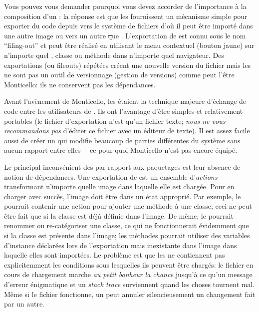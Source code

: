 \documentclass[a4paper,10pt,twoside]{book}
\begin{document}
Vous pouvez vous demander pourquoi vous devez accorder de l'importance \`a la composition
d'un \changeset: la r\'eponse est que les \changesets fournissent un m\'ecanisme simple
pour exporter du code depuis \pharo vers le syst\`eme de fichiers d'o\`u il peut
\^etre import\'e dans une autre image \pharo ou vers un autre \st que \pharo.
L'exportation de \changeset est connu sous le nom ``filing-out'' et peut \^etre r\'ealis\'e
en utilisant le menu contextuel (bouton jaune) sur n'importe quel \changeset, classe ou
m\'ethode dans n'importe quel navigateur.
Des exportations (ou fileouts) r\'ep\'et\'ees cr\'eent une nouvelle version du fichier
mais les \changesets ne sont pas un outil de versionnage (gestion de
versions) comme peut l'\^etre Monticello:
ils ne conservent pas les d\'ependances.

Avant l'av\`{e}nement de Monticello, les \changesets \'etaient la
technique majeure d'\'echange de code entre les utilisateurs de \pharo. %
Ils ont l'avantage d'\^etre simples et relativement portables (le fichier d'exportation n'est qu'un fichier texte; 
\emph{nous ne vous recommandons pas} d'\'editer ce fichier avec un \'editeur de texte).
Il est assez facile aussi de cr\'eer un \changeset qui modifie
beaucoup de parties diff\'erentes du syst\`eme sans aucun rapport
entre elles\,---\,ce pour quoi Monticello n'est pas encore \'equip\'e.

Le principal inconv\'enient des \changesets par rapport aux paquetages 
est leur absence de notion de d\'ependances.
Une exportation de \changeset est un ensemble d'\emph{actions} transformant n'importe quelle
image dans laquelle elle est charg\'ee. Pour en charger avec succ\`es, l'image doit \^etre
dans un \'etat appropri\'e.
Par exemple, le \changeset pourrait contenir une action pour ajouter une m\'ethode \`a une
classe; ceci ne peut \^etre fait que si la classe est d\'ej\`a d\'efinie dans l'image.
De m\^eme, le \changeset pourrait renommer ou re-cat\'egoriser une classe, ce qui ne 
fonctionnerait \'evidemment que si la classe est pr\'esente dans l'image; les m\'ethodes
pourrait utiliser des variables d'instance d\'eclar\'ees lors de l'exportation mais
inexistante dans l'image dans laquelle elles sont import\'ees.
Le probl\`eme est que les \changesets ne contiennent pas explicitemment les conditions 
sous lesquelles ils peuvent \^etre charg\'es:
le fichier en cours de chargement marche \emph{au petit bonheur la chance} jusqu'\`a
ce qu'un message d'erreur \'enigmatique et un \emph{stack trace} surviennent
quand les choses tournent mal.
M\^eme si le fichier fonctionne, un \changeset peut annuler silencieusement 
un changement fait par un autre.
\end{document}
